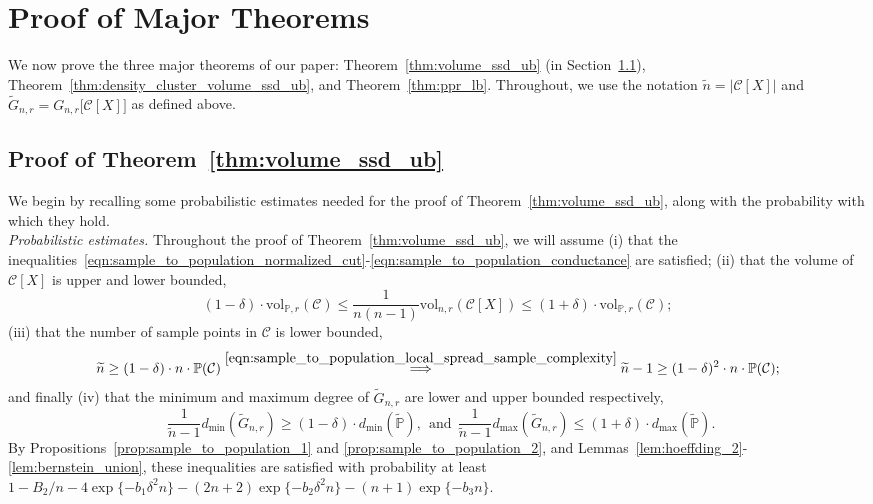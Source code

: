 \documentclass[twoside,11pt]{article}
\newcommand{\1}{\mathbf{1}}
\newcommand{\mc}[1]{\mathcal{#1}}
\newcommand{\mbb}[1]{\mathbb{#1}}
\newcommand{\Pbb}{\mathbb{P}}
\newcommand{\wt}[1]{\widetilde{#1}}
\newcommand{\vol}{\mathrm{vol}}
\begin{document}
\section{Proof of Major Theorems}
\label{apdx:pf_major_theorems}
We now prove the three major theorems of our paper: Theorem~\ref{thm:volume_ssd_ub} (in Section~\ref{subsec:pf_volume_ssd_ub}), Theorem~\ref{thm:density_cluster_volume_ssd_ub}, and Theorem~\ref{thm:ppr_lb}.  Throughout, we use the notation $\wt{n} = |\mc{C}[X]|$ and $\wt{G}_{n,r} = G_{n,r}\bigl[\mc{C}[X]\bigr]$ as defined above.

\subsection{Proof of Theorem~\ref{thm:volume_ssd_ub}}
\label{subsec:pf_volume_ssd_ub}
We begin by recalling some probabilistic estimates needed for the proof of Theorem~\ref{thm:volume_ssd_ub}, along with the probability with which they hold.\\

\noindent\emph{Probabilistic estimates.}
Throughout the proof of Theorem~\ref{thm:volume_ssd_ub}, we will assume (i) that the inequalities~\eqref{eqn:sample_to_population_normalized_cut}-\eqref{eqn:sample_to_population_conductance} are satisfied; (ii) that the volume of $\mc{C}[X]$ is upper and lower bounded,
\begin{equation}
\label{pf:volume_ssd_ub_1}
(1 - \delta) \cdot \vol_{\Pbb,r}(\mc{C}) \leq \frac{1}{n(n-1)}\vol_{n,r}(\mc{C}[X]) \leq (1 + \delta) \cdot \vol_{\Pbb,r}(\mc{C});
\end{equation}
(iii) that the number of sample points in $\mc{C}$ is lower bounded,
\begin{equation}
\label{pf:volume_ssd_ub_2}
\wt{n} \geq (1 - \delta) \cdot n \cdot \mbb{P}(\mc{C}) \overset{\eqref{eqn:sample_to_population_local_spread_sample_complexity}}{\Longrightarrow} \wt{n} - 1 \geq (1 - \delta)^2 \cdot n \cdot \mbb{P}(\mc{C});
\end{equation}
and finally (iv) that the minimum and maximum degree of $\wt{G}_{n,r}$ are lower and upper bounded respectively,
\begin{equation}
\label{pf:volume_ssd_ub_3}
~~\frac{1}{\wt{n} - 1} d_{\min}(\wt{G}_{n,r}) \geq (1 - \delta) \cdot d_{\min}(\wt{\Pbb}),~~\textrm{and}~~\frac{1}{\wt{n} - 1} d_{\max}(\wt{G}_{n,r}) \leq (1 + \delta) \cdot d_{\max}(\wt{\Pbb}).
\end{equation}
By Propositions~\ref{prop:sample_to_population_1} and \ref{prop:sample_to_population_2}, and Lemmas~\ref{lem:hoeffding_2}-\ref{lem:bernstein_union}, these inequalities are satisfied with probability at least $1 - B_2/n - 4\exp\{-b_1\delta^2n\} - (2n + 2)\exp\{-b_2\delta^2n\} - (n + 1)\exp\{-b_3n\}$.\\
\end{document}
